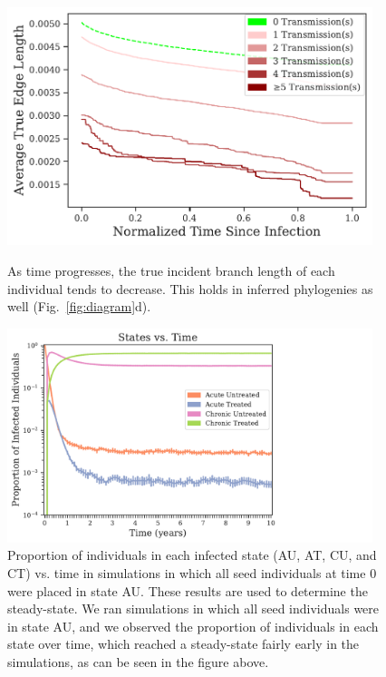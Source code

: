 \documentclass[a4paper,11pt]{article}
\begin{document}
\clearpage

\begin{figure}[!h]
\centering
\includegraphics[width=0.95\textwidth]{figs/avg_edgelength_vs_time_true.pdf}\\
\caption{As time progresses, the true incident branch length of each individual tends to decrease. This holds in inferred phylogenies as well (Fig.~\ref{fig:diagram}d).}
\label{fig:true-bl-vs-time}
\end{figure}

\clearpage

\begin{figure}[!h]
\centering
\includegraphics[width=0.95\textwidth]{figs/prop_state_vs_time.pdf}
\caption{Proportion of individuals in each infected state (AU, AT, CU, and CT) vs. time in simulations in which all seed individuals at time 0 were placed in state AU.
These results are used to determine the steady-state.
We ran simulations in which all seed individuals were in state AU, and we observed the proportion of individuals in each state over time, which reached a steady-state fairly early in the simulations, as can be seen in the figure above. }
\label{fig:prop-state-vs-time}
\end{figure}
\end{document}
